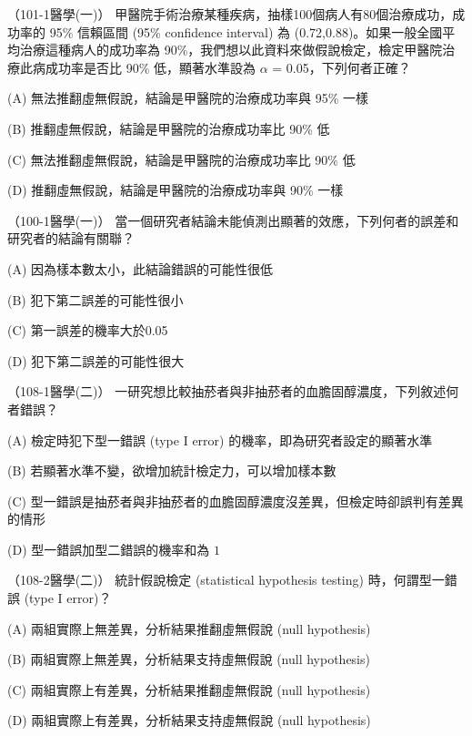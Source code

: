     \begin{docexam}{（101-1醫學(一)）}
        甲醫院手術治療某種疾病，抽樣100個病人有80個治療成功，成功率的 95\% 信賴區間 (95\% confidence interval) 為 (0.72,0.88)。如果一般全國平均治療這種病人的成功率為 90\%，我們想以此資料來做假說檢定，檢定甲醫院治療此病成功率是否比 90\% 低，顯著水準設為 $\alpha$ = 0.05，下列何者正確？

        (A) 無法推翻虛無假說，結論是甲醫院的治療成功率與 95\% 一樣

        (B) 推翻虛無假說，結論是甲醫院的治療成功率比 90\% 低

        (C) 無法推翻虛無假說，結論是甲醫院的治療成功率比 90\% 低

        (D) 推翻虛無假說，結論是甲醫院的治療成功率與 90\% 一樣
    \end{docexam}
    
    \begin{docexam}{（100-1醫學(一)）}
        當一個研究者結論未能偵測出顯著的效應，下列何者的誤差和研究者的結論有關聯？

        (A) 因為樣本數太小，此結論錯誤的可能性很低

        (B) 犯下第二誤差的可能性很小

        (C) 第一誤差的機率大於0.05

        (D) 犯下第二誤差的可能性很大
    \end{docexam}
    
    \begin{docexam}{（108-1醫學(二)）}
        一研究想比較抽菸者與非抽菸者的血膽固醇濃度，下列敘述何者錯誤？

        (A) 檢定時犯下型一錯誤 (type I error) 的機率，即為研究者設定的顯著水準

        (B) 若顯著水準不變，欲增加統計檢定力，可以增加樣本數

        (C) 型一錯誤是抽菸者與非抽菸者的血膽固醇濃度沒差異，但檢定時卻誤判有差異的情形

        (D) 型一錯誤加型二錯誤的機率和為 $1$
    \end{docexam}
    
    \begin{docexam}{（108-2醫學(二)）}
        統計假說檢定 (statistical hypothesis testing) 時，何謂型一錯誤 (type I error)？

        (A) 兩組實際上無差異，分析結果推翻虛無假說 (null hypothesis) 

        (B) 兩組實際上無差異，分析結果支持虛無假說 (null hypothesis) 

        (C) 兩組實際上有差異，分析結果推翻虛無假說 (null hypothesis) 

        (D) 兩組實際上有差異，分析結果支持虛無假說 (null hypothesis) 
    \end{docexam}
    
